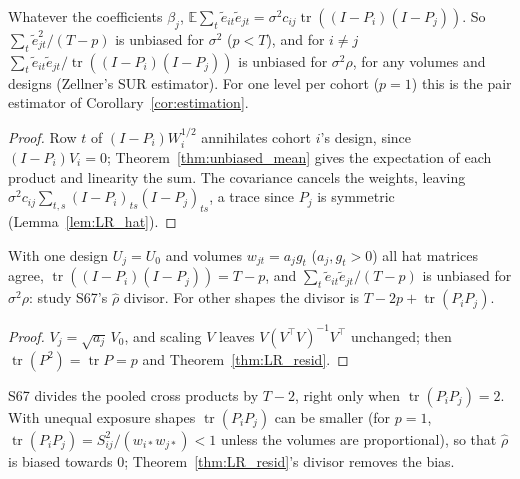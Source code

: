 \begin{theorem}\label{thm:LR_resid}
  \leanok
  Whatever the coefficients $\beta_j$,
  $\mathbb E\sum_t \tilde e_{it}\tilde e_{jt} = \sigma^2c_{ij}\operatorname{tr}((I - P_i)(I - P_j))$.
  So $\sum_t\tilde e_{jt}^2/(T - p)$ is unbiased for $\sigma^2$ ($p < T$), and for $i \ne j$
  $\sum_t\tilde e_{it}\tilde e_{jt}/\operatorname{tr}((I - P_i)(I - P_j))$ is unbiased for
  $\sigma^2\rho$, for any volumes and designs (Zellner's SUR estimator). For one level per
  cohort ($p = 1$) this is the pair estimator of Corollary~\ref{cor:estimation}.
\end{theorem}
\begin{proof}
  \leanok
  Row $t$ of $(I - P_i)W_i^{1/2}$ annihilates cohort $i$'s design, since $(I - P_i)V_i = 0$;
  Theorem~\ref{thm:unbiased_mean} gives the expectation of each product and linearity the sum.
  The covariance cancels the weights, leaving $\sigma^2c_{ij}\sum_{t,s}(I - P_i)_{ts}(I - P_j)_{ts}$,
  a trace since $P_j$ is symmetric (Lemma~\ref{lem:LR_hat}).
\end{proof}

\begin{theorem}\label{thm:LR_shape}
  \leanok
  With one design $U_j = U_0$ and volumes $w_{jt} = a_jg_t$ ($a_j, g_t > 0$) all hat matrices
  agree, $\operatorname{tr}((I - P_i)(I - P_j)) = T - p$, and
  $\sum_t\tilde e_{it}\tilde e_{jt}/(T - p)$ is unbiased for $\sigma^2\rho$: study S67's
  $\hat\rho$ divisor. For other shapes the divisor is $T - 2p + \operatorname{tr}(P_iP_j)$.
\end{theorem}
\begin{proof}
  \leanok
  $V_j = \sqrt{a_j}\,V_0$, and scaling $V$ leaves $V(V^\top V)^{-1}V^\top$ unchanged; then
  $\operatorname{tr}(P^2) = \operatorname{tr}P = p$ and Theorem~\ref{thm:LR_resid}.
\end{proof}

\begin{remark}
  S67 divides the pooled cross products by $T - 2$, right only when $\operatorname{tr}(P_iP_j) = 2$.
  With unequal exposure shapes $\operatorname{tr}(P_iP_j)$ can be smaller (for $p = 1$,
  $\operatorname{tr}(P_iP_j) = S_{ij}^2/(w_{i*}w_{j*}) < 1$ unless the volumes are proportional),
  so that $\hat\rho$ is biased towards $0$; Theorem~\ref{thm:LR_resid}'s divisor removes the bias.
\end{remark}

